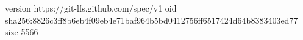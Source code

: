 version https://git-lfs.github.com/spec/v1
oid sha256:8826c3ff8b6eb4f09eb4e71baf964b5bd0412756ff6517424d64b8383403ed77
size 5566
